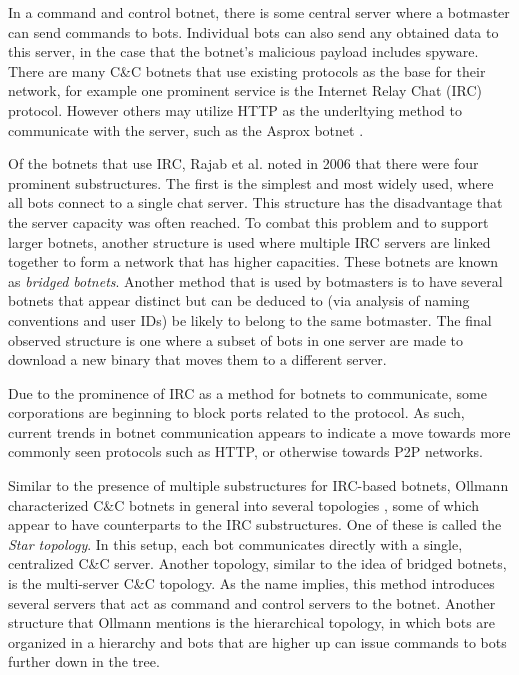 \documentclass{acm_proc_article-sp}
\begin{document}
In a command and control botnet, there is some central server where a botmaster can send commands to bots. Individual bots can also send any obtained data to this server, in the case that the botnet’s malicious payload includes spyware. There are many C\&C botnets that use existing protocols as the base for their network, for example one prominent service is the Internet Relay Chat (IRC) protocol. However others may utilize HTTP as the underltying method to communicate with the server, such as the Asprox botnet \cite{borgaonkar:analysis}. 

Of the botnets that use IRC, Rajab et al. noted in 2006  \cite{rajab:botnets} that there were four prominent substructures. The first is the simplest and most widely used, where all bots connect to a single chat server. This structure has the disadvantage that the server capacity was often reached. To combat this problem and to support larger botnets, another structure is used where multiple IRC servers are linked together to form a network that has higher capacities. These botnets are known as \emph{bridged botnets}. Another method that is used by botmasters is to have several botnets that appear distinct but can be deduced to (via analysis of naming conventions and user IDs) be likely to belong to the same botmaster. The final observed structure is one where a subset of bots in one server are made to download a new binary that moves them to a different server.

Due to the prominence of IRC as a method for botnets to communicate, some corporations are beginning to block ports related to the protocol. As such, current trends in botnet communication appears to indicate a move towards more commonly seen protocols such as HTTP, or otherwise towards P2P networks.

Similar to the presence of multiple substructures for IRC-based botnets, Ollmann characterized C\&C botnets in general into several topologies \cite{ollmann:topology}, some of which appear to have counterparts to the IRC substructures. One of these is called the \emph{Star topology}. In this setup, each bot communicates directly with a single, centralized C\&C server. Another topology, similar to the idea of bridged botnets, is the multi-server C\&C topology. As the name implies, this method introduces several servers that act as command and control servers to the botnet. Another structure that Ollmann mentions is the hierarchical topology, in which bots are organized in a hierarchy and bots that are higher up can issue commands to bots further down in the tree.
\end{document}
